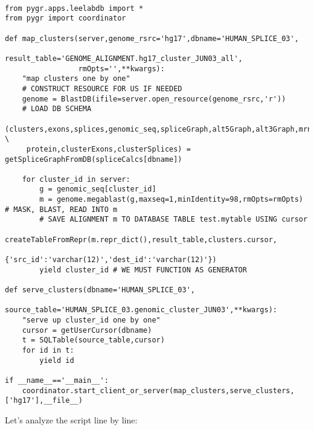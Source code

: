 \documentclass{howto}
\begin{document}
\begin{verbatim}

from pygr.apps.leelabdb import *
from pygr import coordinator

def map_clusters(server,genome_rsrc='hg17',dbname='HUMAN_SPLICE_03',
                 result_table='GENOME_ALIGNMENT.hg17_cluster_JUN03_all',
                 rmOpts='',**kwargs):
    "map clusters one by one"
    # CONSTRUCT RESOURCE FOR US IF NEEDED
    genome = BlastDB(ifile=server.open_resource(genome_rsrc,'r'))
    # LOAD DB SCHEMA
    (clusters,exons,splices,genomic_seq,spliceGraph,alt5Graph,alt3Graph,mrna, \
     protein,clusterExons,clusterSplices) = getSpliceGraphFromDB(spliceCalcs[dbname])

    for cluster_id in server:
        g = genomic_seq[cluster_id]
        m = genome.megablast(g,maxseq=1,minIdentity=98,rmOpts=rmOpts) # MASK, BLAST, READ INTO m
        # SAVE ALIGNMENT m TO DATABASE TABLE test.mytable USING cursor
        createTableFromRepr(m.repr_dict(),result_table,clusters.cursor,
                            {'src_id':'varchar(12)','dest_id':'varchar(12)'})
        yield cluster_id # WE MUST FUNCTION AS GENERATOR

def serve_clusters(dbname='HUMAN_SPLICE_03',
                   source_table='HUMAN_SPLICE_03.genomic_cluster_JUN03',**kwargs):
    "serve up cluster_id one by one"
    cursor = getUserCursor(dbname)
    t = SQLTable(source_table,cursor)
    for id in t:
        yield id

if __name__=='__main__':
    coordinator.start_client_or_server(map_clusters,serve_clusters,['hg17'],__file__)
\end{verbatim}

Let's analyze the script line by line:
\end{document}
